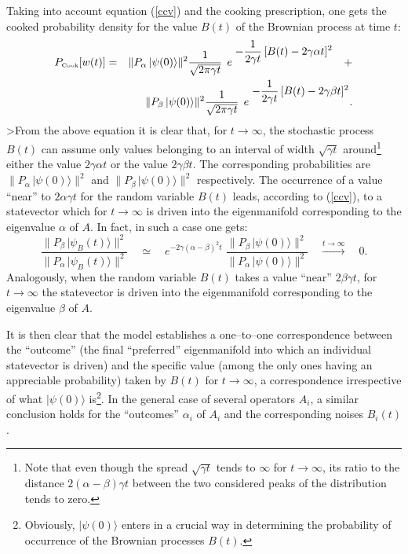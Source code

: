 \documentclass[12pt]{article}
\begin{document}
Taking into account equation (\ref{ccv}) and the cooking
prescription, one gets the cooked probability density for the
value $B(t)$ of the Brownian process at time $t$:
\begin{eqnarray} \label{waxmi}
P_{\makebox{\tiny Cook}}[w(t)] & = & \|
P_{\alpha}\,|\psi(0)\rangle \|^{2} \frac{1}{\sqrt{2\pi\gamma t}}\,
\; e^{\displaystyle\; -\frac{1}{2\gamma t}\,
[B(t) - 2 \gamma \alpha t]^{2}} \quad + \nonumber \\
& & \| P_{\beta}\,|\psi(0)\rangle \|^{2} \frac{1}{\sqrt{2\pi\gamma
t}}\, \; e^{\displaystyle\; -\frac{1}{2\gamma t}\, [B(t) - 2
\gamma \beta t]^{2}}.
\end{eqnarray}
>From the above equation it is clear that, for $t \rightarrow
\infty$, the stochastic process $B(t)$ can assume only values
belonging to an interval of width $\sqrt{\gamma t}$
around\footnote{Note that even though the spread $\sqrt{\gamma t}$
tends to $\infty$ for $t \rightarrow \infty$, its ratio to the
distance $2(\alpha -\beta)\gamma t$ between the two considered
peaks of the distribution tends to zero.} either the value
$2\gamma \alpha t$ or the value $2\gamma \beta t$. The
corresponding probabilities are $\| P_{\alpha}\,|\psi(0)\rangle
\|^{2}$ and $\| P_{\beta}\,|\psi(0)\rangle \|^{2}$ respectively.
The occurrence of a value ``near'' to $2 \alpha\gamma t$ for the
random variable $B(t)$ leads, according to (\ref{ccv}), to a
statevector which for $t \rightarrow \infty$ is driven into the
eigenmanifold corresponding to the eigenvalue $\alpha$ of $A$. In
fact, in such a case one gets:
\begin{equation}
\frac{\| P_{\beta}\,|\psi_{B}(t)\rangle \|^{2}}{\| P_{\alpha}\,
|\psi_{B}(t)\rangle \|^{2}} \quad \simeq \quad e^{\displaystyle
-2\gamma (\alpha -\beta)^{2}t} \; \frac{\|
P_{\beta}\,|\psi(0)\rangle \|^{2}}{\| P_{\alpha}\,|\psi(0)\rangle
\|^{2}} \quad \stackrel{t \rightarrow \infty}{\longrightarrow}
\quad 0.
\end{equation}
Analogously, when the random variable $B(t)$ takes a value
``near'' $2 \beta\gamma t$, for $t \rightarrow \infty$ the
statevector is driven into the eigenmanifold corresponding to the
eigenvalue $\beta$ of $A$.

It is then clear that the model establishes a one--to--one
correspondence between the ``outcome'' (the final ``preferred''
eigenmanifold into which an individual statevector is driven) and
the specific value (among the only ones having an appreciable
probability) taken by $B(t)$ for $t \rightarrow \infty$, a
correspondence irrespective of what $|\psi(0)\rangle$
is\footnote{Obviously, $|\psi(0)\rangle$ enters in a crucial way
in determining the probability of occurrence of the Brownian
processes $B(t)$.}. In the general case of several operators
$A_{i}$, a similar conclusion holds for the ``outcomes''
$\alpha_{i}$ of $A_{i}$ and the corresponding noises $B_{i}(t)$.
\end{document}

